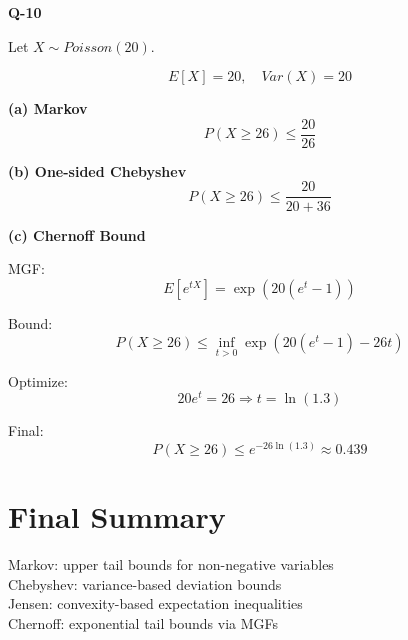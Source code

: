 \documentclass[12pt]{article}
\begin{document}
\textbf{Q-10}

Let $X \sim Poisson(20)$.

\[
E[X] = 20, \quad Var(X) = 20
\]

\textbf{(a) Markov}
\[
P(X \ge 26) \le \frac{20}{26}
\]

\textbf{(b) One-sided Chebyshev}
\[
P(X \ge 26) \le \frac{20}{20 + 36}
\]

\textbf{(c) Chernoff Bound}

MGF:
\[
E[e^{tX}] = \exp(20(e^t - 1))
\]

Bound:
\[
P(X \ge 26) \le \inf_{t>0} \exp(20(e^t - 1) - 26t)
\]

Optimize:
\[
20e^t = 26 \Rightarrow t = \ln(1.3)
\]

Final:
\[
P(X \ge 26) \le e^{-26 \ln(1.3)} \approx 0.439
\]

\section*{Final Summary}

Markov: upper tail bounds for non-negative variables\\
Chebyshev: variance-based deviation bounds\\
Jensen: convexity-based expectation inequalities\\
Chernoff: exponential tail bounds via MGFs
\end{document}
